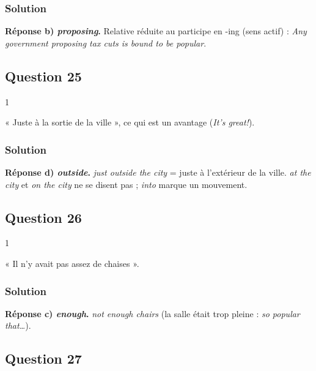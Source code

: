 \documentclass[11pt,a4paper]{article}
\begin{document}
\hypertarget{solution-23}{%
\subsubsection{Solution}\label{solution-23}}

\textbf{Réponse b) \emph{proposing}.} Relative réduite au participe en -ing (sens actif) : \emph{Any government proposing tax cuts is bound to be popular}.

\hypertarget{question-25}{%
\subsection{Question 25}\label{question-25}}

\begin{indication}{1}

« Juste à la sortie de la ville », ce qui est un avantage (\emph{It's great!}).

\end{indication}

\hypertarget{solution-24}{%
\subsubsection{Solution}\label{solution-24}}

\textbf{Réponse d) \emph{outside}.} \emph{just outside the city} = juste à l'extérieur de la ville. \emph{at the city} et \emph{on the city} ne se disent pas ; \emph{into} marque un mouvement.

\hypertarget{question-26}{%
\subsection{Question 26}\label{question-26}}

\begin{indication}{1}

« Il n'y avait pas assez de chaises ».

\end{indication}

\hypertarget{solution-25}{%
\subsubsection{Solution}\label{solution-25}}

\textbf{Réponse c) \emph{enough}.} \emph{not enough chairs} (la salle était trop pleine : \emph{so popular that\ldots{}}).

\hypertarget{question-27}{%
\subsection{Question 27}\label{question-27}}
\end{document}
